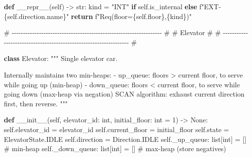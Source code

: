 \documentclass[11pt]{article}
\newenvironment{Shaded}{\begin{snugshade}}{\end{snugshade}}
\newcommand{\BuiltInTok}[1]{\textcolor[rgb]{0.50,0.55,0.55}{#1}}
\newcommand{\CommentTok}[1]{\textcolor[rgb]{0.48,0.49,0.49}{#1}}
\newcommand{\ControlFlowTok}[1]{\textcolor[rgb]{0.99,0.74,0.29}{\textbf{#1}}}
\newcommand{\DecValTok}[1]{\textcolor[rgb]{0.96,0.45,0.00}{#1}}
\newcommand{\FunctionTok}[1]{\textcolor[rgb]{0.56,0.27,0.68}{#1}}
\newcommand{\KeywordTok}[1]{\textcolor[rgb]{0.81,0.81,0.76}{\textbf{#1}}}
\newcommand{\NormalTok}[1]{\textcolor[rgb]{0.81,0.81,0.76}{#1}}
\newcommand{\OperatorTok}[1]{\textcolor[rgb]{0.81,0.81,0.76}{#1}}
\newcommand{\SpecialCharTok}[1]{\textcolor[rgb]{0.24,0.68,0.91}{#1}}
\newcommand{\SpecialStringTok}[1]{\textcolor[rgb]{0.85,0.27,0.33}{#1}}
\newcommand{\StringTok}[1]{\textcolor[rgb]{0.96,0.31,0.31}{#1}}
\newcommand{\VariableTok}[1]{\textcolor[rgb]{0.15,0.68,0.68}{#1}}
\begin{document}
\begin{Shaded}
\begin{Highlighting}[]
    \KeywordTok{def} \FunctionTok{\_\_repr\_\_}\NormalTok{(}\VariableTok{self}\NormalTok{) }\OperatorTok{{-}\textgreater{}} \BuiltInTok{str}\NormalTok{:}
\NormalTok{        kind }\OperatorTok{=} \StringTok{"INT"} \ControlFlowTok{if} \VariableTok{self}\NormalTok{.is\_internal }\ControlFlowTok{else} \SpecialStringTok{f"EXT{-}}\SpecialCharTok{\{}\VariableTok{self}\SpecialCharTok{.}\NormalTok{direction}\SpecialCharTok{.}\NormalTok{name}\SpecialCharTok{\}}\SpecialStringTok{"}
        \ControlFlowTok{return} \SpecialStringTok{f"Req(floor=}\SpecialCharTok{\{}\VariableTok{self}\SpecialCharTok{.}\NormalTok{floor}\SpecialCharTok{\}}\SpecialStringTok{,}\SpecialCharTok{\{}\NormalTok{kind}\SpecialCharTok{\}}\SpecialStringTok{)"}


\CommentTok{\# {-}{-}{-}{-}{-}{-}{-}{-}{-}{-}{-}{-}{-}{-}{-}{-}{-}{-}{-}{-}{-}{-}{-}{-}{-}{-}{-}{-}{-}{-}{-}{-}{-}{-}{-}{-}{-}{-}{-}{-}{-}{-}{-}{-}{-}{-}{-}{-}{-}{-}{-}{-}{-}{-}{-}{-}{-}{-}{-}{-}{-}{-}{-}{-}{-}{-} \#}
\CommentTok{\# Elevator                                                            \#}
\CommentTok{\# {-}{-}{-}{-}{-}{-}{-}{-}{-}{-}{-}{-}{-}{-}{-}{-}{-}{-}{-}{-}{-}{-}{-}{-}{-}{-}{-}{-}{-}{-}{-}{-}{-}{-}{-}{-}{-}{-}{-}{-}{-}{-}{-}{-}{-}{-}{-}{-}{-}{-}{-}{-}{-}{-}{-}{-}{-}{-}{-}{-}{-}{-}{-}{-}{-}{-} \#}

\KeywordTok{class}\NormalTok{ Elevator:}
    \CommentTok{"""}
\CommentTok{    Single elevator car.}

\CommentTok{    Internally maintains two min{-}heaps:}
\CommentTok{      {-} up\_queue: floors \textgreater{} current floor, to serve while going up (min{-}heap)}
\CommentTok{      {-} down\_queue: floors \textless{} current floor, to serve while going down (max{-}heap via negation)}
\CommentTok{    SCAN algorithm: exhaust current direction first, then reverse.}
\CommentTok{    """}

    \KeywordTok{def} \FunctionTok{\_\_init\_\_}\NormalTok{(}\VariableTok{self}\NormalTok{, elevator\_id: }\BuiltInTok{int}\NormalTok{, initial\_floor: }\BuiltInTok{int} \OperatorTok{=} \DecValTok{1}\NormalTok{) }\OperatorTok{{-}\textgreater{}} \VariableTok{None}\NormalTok{:}
        \VariableTok{self}\NormalTok{.elevator\_id }\OperatorTok{=}\NormalTok{ elevator\_id}
        \VariableTok{self}\NormalTok{.current\_floor }\OperatorTok{=}\NormalTok{ initial\_floor}
        \VariableTok{self}\NormalTok{.state }\OperatorTok{=}\NormalTok{ ElevatorState.IDLE}
        \VariableTok{self}\NormalTok{.direction }\OperatorTok{=}\NormalTok{ Direction.IDLE}
        \VariableTok{self}\NormalTok{.\_up\_queue: }\BuiltInTok{list}\NormalTok{[}\BuiltInTok{int}\NormalTok{] }\OperatorTok{=}\NormalTok{ []    }\CommentTok{\# min{-}heap}
        \VariableTok{self}\NormalTok{.\_down\_queue: }\BuiltInTok{list}\NormalTok{[}\BuiltInTok{int}\NormalTok{] }\OperatorTok{=}\NormalTok{ []  }\CommentTok{\# max{-}heap (store negatives)}


\end{Highlighting}
\end{Shaded}
\end{document}
